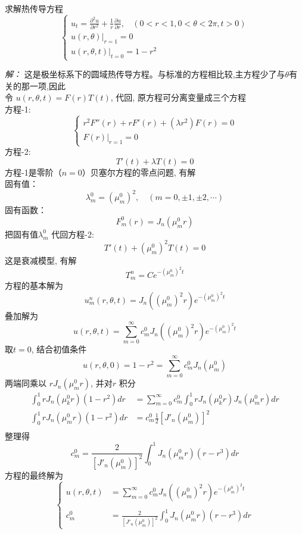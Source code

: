 \begin{example}
	求解热传导方程
	$$\begin{cases}
		\displaystyle u_t= \frac{\partial^2 u }{\partial r^2 } +\frac{1}{r } \frac{\partial u }{\partial r }, ~~~~ (0<r<1, 0<\theta<2\pi, t>0) \\
		u(r,\theta)|_{r=1}=0 	\\
		u(r,\theta,t)|_{t=0} =1-r^2
	\end{cases} $$
\end{example}
\emph{解：}
	这是极坐标系下的圆域热传导方程。与标准的方程相比较,主方程少了与$\theta$有关的那一项,因此 \\
	令 $u(r,\theta,t) =F(r)T(t)$, 代回, 原方程可分离变量成三个方程 \\
	方程-1:	$$ \begin{cases}
		r^2 F'' (r)+r F'(r) +( \lambda r^2 )F(r)=0  \\
		F(r)|_{r=1}=0
	\end{cases} $$
	方程-2: \begin{equation*}
		T'(t)+\lambda T(t)=0 
	\end{equation*}	
	方程-1是零阶（$n=0$）贝塞尔方程的零点问题, 有解 \\
	固有值：
	\[\lambda_m ^0 =(\mu_{m}^{0})^2, \quad (m=0, \pm 1, \pm 2,\cdots) \]
	固有函数：\[F_m ^0(r) = J_n (\mu_{m}^{0}r) \]
	把固有值$ \lambda_m ^0  $ 代回方程-2: \begin{equation*}
		T'(t)+(\mu_{m}^{0})^2 T(t)=0 
	\end{equation*}	
	这是衰减模型, 有解
	\begin{equation*}
		T_m ^n=Ce^{- (\mu_{m}^{0})^2t}
	\end{equation*}
	方程的基本解为
	$$u_m ^n(r,\theta,t) = J_n ((\mu_{m}^{0})^2r) e^{- (\mu_{m}^{0})^2 t}$$
	叠加解为
	$$u(r,\theta,t) = \sum_{m=0}^{\infty} c_m ^0 J_n ((\mu_{m}^{0})^2r) e^{- (\mu_{m}^{0})^2 t}$$
	取$t=0$, 结合初值条件
	$$u(r,\theta,0) = 1- r^2  = \sum_{m=0}^{\infty} c_m ^0 J_n (\mu_{m}^{0}) $$
	两端同乘以 $ r J_n (\mu_{m}^{0}r)$, 并对$r$ 积分
	\[ \begin{aligned}
		\int _0 ^{1} r J_n (\mu_{k}^{0}r)  (1-r^2)  dr & = \sum_{m=0}^{\infty} c_m ^0 \int _0 ^{1}   r J_n (\mu_{k}^{0}r) J_n (\mu_{m}^{0}r) dr \\
		\int _0 ^{1}  r J_n (\mu_{m}^{0}r) (1-r^2)  dr & = c_m ^0 \frac{1}{2} [J'_n(\mu_m ^0)]^2 \\
		\end{aligned}\]
	整理得
	\[c_m ^0 = \frac{2}{[J'_n(\mu_m ^0)]^2} \int _0 ^{1} J_n (\mu_{m}^{0}r) (r-r^3) dr \]
	方程的最终解为
	\[
	\left\{\begin{aligned}
		u(r,\theta,t) &= \sum_{m=0}^{\infty} c_m ^0 J_n ((\mu_{m}^{0})^2r) e^{- (\mu_{m}^{0})^2 t} \\
		\\
		c_m ^0 &= \frac{2}{[J'_n(\mu_m ^0)]^2} \int _0 ^{1} J_n (\mu_{m}^{0}r) (r-r^3) dr  
	\end{aligned}\right. \]

